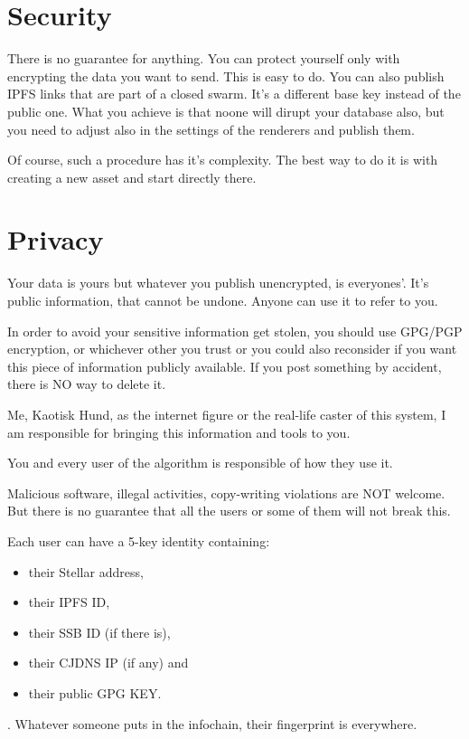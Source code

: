 \documentclass[10pt,a4paper,twocolumn]{paper}
\begin{document}
	\section{Security}\label{security}
	There is no guarantee for anything. You can protect yourself only with encrypting the data you want to send. This is easy to do. You can also publish IPFS links that are part of a closed swarm. It's a different base key instead of the public one. What you achieve is that noone will dirupt your database also, but you need to adjust also in the settings of the renderers and publish them.

	Of course, such a procedure has it's complexity. The best way to do it is with creating a new asset and start directly there.


	\section{Privacy}\label{privacy}

	Your data is yours but whatever you publish unencrypted, is everyones'. It's public information, that cannot be undone. Anyone can use it to refer to you.

	In order to avoid your sensitive information get stolen, you should use GPG/PGP encryption, or whichever other you trust or you could also reconsider if you want this piece of information publicly available. If you post something by accident, there is NO way to delete it.

	Me, Kaotisk Hund, as the internet figure or the real-life caster of this system, I am responsible for bringing this information and tools to you. 
	
	You and every user of the algorithm is responsible of how they use it.

	Malicious software, illegal activities, copy-writing violations are NOT welcome. But there is no guarantee that all the users or some of them will not break this.

	Each user can have a 5-key identity containing: \begin{itemize}
	\item their Stellar address,
	\item their IPFS ID,
	\item their SSB ID (if there is),
	\item their CJDNS IP (if any) and
	\item their public GPG KEY.
	\end{itemize}. Whatever someone puts in the infochain, their fingerprint is everywhere.
	
\end{document}
